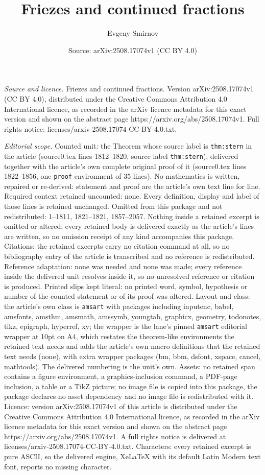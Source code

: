 \documentclass[10pt,a4paper]{amsart}
\title[Friezes and continued fractions]{Friezes and continued fractions}
\author{Evgeny Smirnov}
\date{Source: arXiv:2508.17074v1 (CC BY 4.0)}
\begin{document}
\maketitle

\noindent\emph{Source and licence.} Friezes and continued fractions. Version arXiv:2508.17074v1 (CC BY 4.0), distributed under the Creative Commons Attribution 4.0 International licence, as recorded in the arXiv licence metadata for this exact version and shown on the abstract page https://arxiv.org/abs/2508.17074v1. Full rights notice: licenses/arxiv-2508.17074-CC-BY-4.0.txt.\par\smallskip

\noindent\textit{Editorial scope.} Counted unit: the Theorem whose source label is \texttt{thm:stern} in the article (source0.tex lines 1812--1820, source label \texttt{thm:stern}), delivered together with the article's own complete original proof of it (source0.tex lines 1822--1856, one \texttt{proof} environment of 35 lines). No mathematics is written, repaired or re-derived: statement and proof are the article's own text line for line. Required context retained uncounted: none. Every definition, display and label of those lines is retained unchanged. Omitted from this package and not redistributed: 1--1811, 1821--1821, 1857--2057. Nothing inside a retained excerpt is omitted or altered: every retained body is delivered exactly as the article's lines are written, so no omission receipt of any kind accompanies this package. Citations: the retained excerpts carry no citation command at all, so no bibliography entry of the article is transcribed and no reference is redistributed. Reference adaptation: none was needed and none was made; every reference inside the delivered unit resolves inside it, so no unresolved reference or citation is produced. Printed slips kept literal: no printed word, symbol, hypothesis or number of the counted statement or of its proof was altered. Layout and class: the article's own class is \texttt{amsart} with packages including inputenc, babel, amsfonts, amsthm, amsmath, amssymb, youngtab, graphicx, geometry, todonotes, tikz, epigraph, hyperref, xy; the wrapper is the lane's pinned \texttt{amsart} editorial wrapper at 10pt on A4, which restates the theorem-like environments the retained text needs and adds the article's own macro definitions that the retained text needs (none), with extra wrapper packages (bm, bbm, dsfont, xspace, cancel, mathtools). The delivered numbering is the unit's own. Assets: no retained span contains a figure environment, a graphics-inclusion command, a PDF-page inclusion, a table or a TikZ picture; no image file is copied into this package, the package declares no asset dependency and no image file is redistributed with it. Licence: version arXiv:2508.17074v1 of this article is distributed under the Creative Commons Attribution 4.0 International licence, as recorded in the arXiv licence metadata for this exact version and shown on the abstract page https://arxiv.org/abs/2508.17074v1. A full rights notice is delivered at licenses/arxiv-2508.17074-CC-BY-4.0.txt. Characters: every retained excerpt is pure ASCII, so the delivered engine, XeLaTeX with its default Latin Modern text font, reports no missing character.
\end{document}
